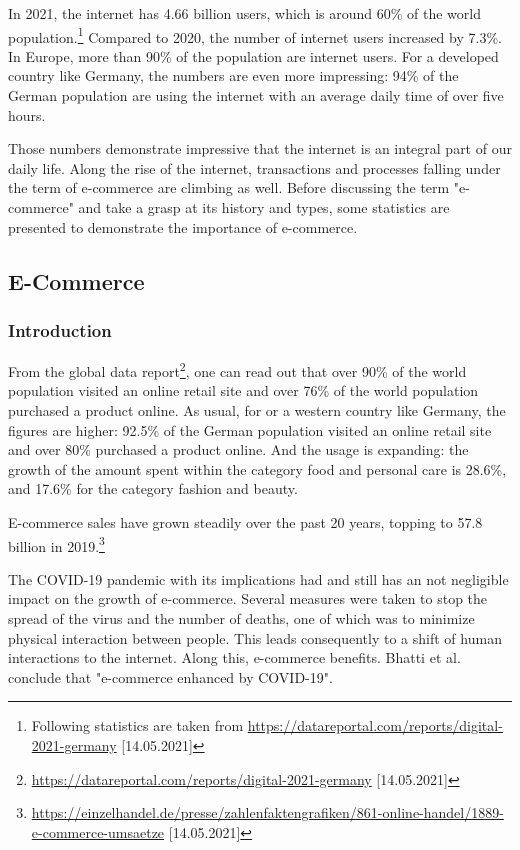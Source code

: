 In 2021, the internet has 4.66 billion users, which is around 60\% of the world population.\footnote{Following statistics are taken from \url{https://datareportal.com/reports/digital-2021-germany} [14.05.2021]}
Compared to 2020, the number of internet users increased by 7.3\%.
In Europe, more than 90\% of the population are internet users.
For a developed country like Germany, the numbers are even more impressing:
94\% of the German population are using the internet with an average daily time of over five hours.

Those numbers demonstrate impressive that the internet is an integral part of our daily life.
Along the rise of the internet, transactions and processes falling under the term of e-commerce are climbing as well.
Before discussing the term "e-commerce" and take a grasp at its history and types, some statistics are presented to demonstrate the importance of e-commerce.


\subsection{E-Commerce}

\subsubsection{Introduction}

From the global data report\footnote{\url{https://datareportal.com/reports/digital-2021-germany} [14.05.2021]}, one can read out that over 90\% of the world population visited an online retail site and over 76\% of the world population purchased a product online.
As usual, for or a western country like Germany, the figures are higher:
92.5\% of the German population visited an online retail site and over 80\% purchased a product online.
And the usage is expanding: the growth of the amount spent within the category food and personal care is 28.6\%, and 17.6\% for the category fashion and beauty.

E-commerce sales have grown steadily over the past 20 years, topping to 57.8 billion in 2019.\footnote{\url{https://einzelhandel.de/presse/zahlenfaktengrafiken/861-online-handel/1889-e-commerce-umsaetze} [14.05.2021]}

The COVID-19 pandemic with its implications had and still has an not negligible impact on the growth of e-commerce.
Several measures were taken to stop the spread of the virus and the number of deaths, one of which was to minimize physical interaction between people.
This leads consequently to a shift of human interactions to the internet.
Along this, e-commerce benefits.
Bhatti et al. \cite{2020Bhatti} conclude that "e-commerce enhanced by COVID-19".



